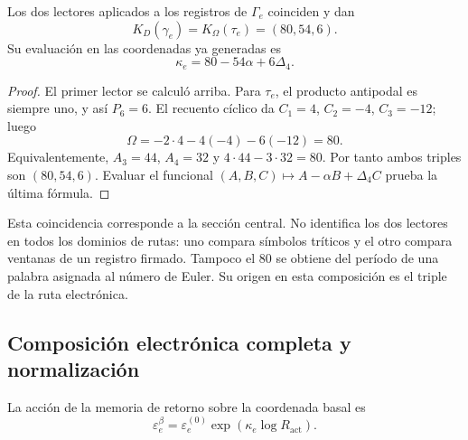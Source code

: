 \begin{theorem}
Los dos lectores aplicados a los registros de \(\Gamma_e\)
coinciden y dan
\begin{equation}
 K_D(\gamma_e)=K_\Omega(\tau_e)=(80,54,6).
 \label{x_reciprocidad:eq:el-triple}
\end{equation}
Su evaluación en las coordenadas ya generadas es
\begin{equation}
 \kappa_e=80-54\alpha+6\Delta_4.
 \label{x_reciprocidad:eq:el-kappa}
\end{equation}
\end{theorem}
\begin{proof}
El primer lector se calculó arriba. Para \(\tau_e\), el producto
antipodal es siempre uno, y así \(P_6=6\). El recuento cíclico da
\(C_1=4\), \(C_2=-4\), \(C_3=-12\); luego
\[
 \Omega=-2\cdot4-4(-4)-6(-12)=80.
\]
Equivalentemente, \(A_3=44\), \(A_4=32\) y
\(4\cdot44-3\cdot32=80\). Por tanto ambos triples son
\((80,54,6)\). Evaluar el funcional
\((A,B,C)\mapsto A-\alpha B+\Delta_4C\) prueba la última fórmula.
\end{proof}

Esta coincidencia corresponde a la sección central. No identifica los
dos lectores en todos los dominios de rutas: uno compara símbolos
tríticos y el otro compara ventanas de un registro firmado. Tampoco el
\(80\) se obtiene del período de una palabra asignada al número de
Euler. Su origen en esta composición es el triple de la ruta
electrónica.

\subsection{Composición electrónica completa y normalización}

\begin{definition}
La acción de la memoria de retorno sobre la coordenada basal es
\begin{equation}
 \varepsilon_e^\beta
 =\varepsilon_e^{(0)}\exp\!\left(\kappa_e\log R_{\mathrm{act}}\right).
 \label{x_reciprocidad:eq:el-beta}
\end{equation}
\end{definition}

